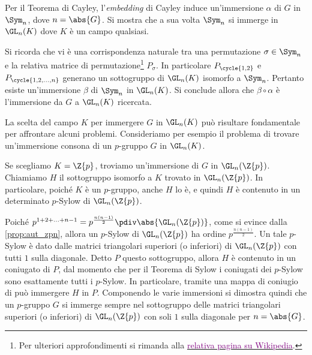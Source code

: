 \documentclass[11pt]{scrartcl}
\begin{document}
	\begin{soln}
		Per il Teorema di Cayley, l'\textit{embedding} di Cayley induce un'immersione
		$\alpha$
		di $G$ in $\Sym_n$, dove $n = \abs{G}$. Si mostra che a sua volta $\Sym_n$
		si immerge in $\GL_n(K)$ dove $K$ è un campo qualsiasi. \medskip
		
		
		Si ricorda che vi è una corrispondenza naturale tra una permutazione $\sigma \in \Sym_n$ e la relativa matrice di permutazione\footnote{
			Per ulteriori approfondimenti si rimanda alla \href{https://it.wikipedia.org/wiki/Matrice_di_permutazione}{{\textcolor{purple}{relativa pagina su Wikipedia}}}.
		} $P_\sigma$. In particolare $P_{\cycle{1, 2}}$ e $P_{\cycle{1, 2, \ldots, n}}$
		generano un sottogruppo di $\GL_n(K)$ isomorfo a $\Sym_n$. Pertanto esiste
		un'immersione $\beta$ di $\Sym_n$ in $\GL_n(K)$.
		Si conclude allora che $\beta \circ \alpha$ è l'immersione da $G$ a
		$\GL_n(K)$ ricercata.
	\end{soln}
	
	\begin{approf}[$\star$]
		La scelta del campo $K$ per immergere $G$ in $\GL_n(K)$ può risultare fondamentale
		per affrontare alcuni problemi. Consideriamo per esempio il problema di
		trovare un'immersione consona di un $p$-gruppo $G$ in $\GL_n(K)$. \medskip
		
		
		Se scegliamo $K = \Z{p}$, troviamo un'immersione di $G$ in $\GL_n(\Z{p})$.
		Chiamiamo $H$ il sottogruppo isomorfo a $K$ trovato in $\GL_n(\Z{p})$.
		In particolare, poiché $K$ è un $p$-gruppo, anche $H$ lo è, e quindi
		$H$ è contenuto in un determinato $p$-Sylow di $\GL_n(\Z{p})$. \medskip
		
		
		Poiché $p^{1 + 2 + \ldots + n-1} = p^{\frac{n(n-1)}{2}} \pdiv \abs{\GL_n(\Z{p})}$,
		come si evince dalla \autoref{prop:aut_zpn}, allora un $p$-Sylow di $\GL_n(\Z{p})$ ha ordine $p^{\frac{n(n-1)}{2}}$. Un tale $p$-Sylow è
		dato dalle matrici triangolari superiori (o inferiori) di $\GL_n(\Z{p})$ con tutti
		$1$ sulla diagonale. Detto $P$ questo sottogruppo, allora
		$H$ è contenuto in un coniugato di $P$, dal momento che per il Teorema
		di Sylow i coniugati dei
		$p$-Sylow sono esattamente tutti i $p$-Sylow. In particolare, tramite una
		mappa di coniugio di può immergere $H$ in $P$. Componendo le varie
		immersioni si dimostra quindi che un $p$-gruppo $G$ si immerge sempre
		nel sottogruppo delle matrici triangolari superiori (o inferiori) di
		$\GL_n(\Z{p})$ con soli $1$ sulla diagonale per $n = \abs{G}$.
	\end{approf}
	
\end{document}
